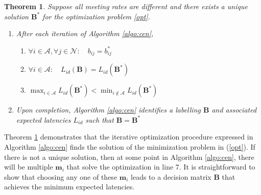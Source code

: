 \documentclass[journal,onecolumn,11pt]{IEEEtran}
\theoremstyle{plain}
\newtheorem{theorem}{Theorem}
\theoremstyle{definition}
\def\bm{{\mathbf m}}
\begin{document}
\begin{theorem}\label{theorem2}
  Suppose all meeting rates are different and there exists
  a unique solution $\mathbf{B}^*$ for the optimization problem \eqref{opt}.
\begin{enumerate}
\item After each iteration of Algorithm \ref{algo:cen},
\begin{enumerate}
\item $\forall i \in \mathcal{A} ,\forall j \in \mathcal{N}: \quad b_{ij}=b_{ij}^*$
\item $\forall i \in \mathcal{A}: \quad L_{id}(\mathbf{B})=L_{id}(\mathbf{B}^*)$
\item $\max_{i \in \mathcal{A}}L_{id}(\mathbf{B}^*)< \min_{i \not\in \mathcal{A}} L_{id}(\mathbf{B}^*) $
\end{enumerate}
\item Upon completion, Algorithm \ref{algo:cen} identifies a labelling $\mathbf{B}$ and associated expected latencies $L_{id}$ such that $\mathbf{B}=\mathbf{B}^*$
\end{enumerate}
\end{theorem}
Theorem \ref{theorem2} demonstrates that the iterative optimization
procedure expressed in Algorithm \ref{algo:cen} finds the solution of
the minimization problem in (\ref{opt}). If there is not a unique
solution, then at some point in Algorithm \ref{algo:cen}, there will
be multiple $\bm_i$ that solve the optimization in line 7. It is
straightforward to show that choosing any one of these $\bm_i$ leads to a
decision matrix $\mathbf{B}$ that achieves the minimum expected latencies. 
\end{document}
